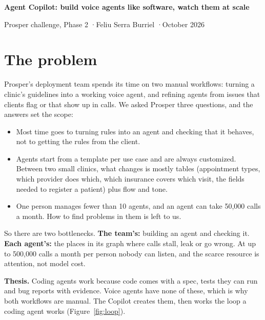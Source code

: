 \documentclass[11pt,a4paper]{article}
\begin{document}
{\raggedright\LARGE\bfseries Agent Copilot: build voice agents like software, watch them at scale\par}
\vspace{2pt}
{\small Prosper challenge, Phase 2 \quad·\quad Feliu Serra Burriel \quad·\quad October 2026}

\section{The problem}

Prosper's deployment team spends its time on two manual workflows: turning a clinic's guidelines into a working voice agent, and refining agents from issues that clients flag or that show up in calls. We asked Prosper three questions, and the answers set the scope:
\begin{itemize}
  \item Most time goes to turning rules into an agent and checking that it behaves, not to getting the rules from the client.
  \item Agents start from a template per use case and are always customized. Between two small clinics, what changes is mostly tables (appointment types, which provider does which, which insurance covers which visit, the fields needed to register a patient) plus flow and tone.
  \item One person manages fewer than 10 agents, and an agent can take 50,000 calls a month. How to find problems in them is left to us.
\end{itemize}

So there are two bottlenecks. \textbf{The team's:} building an agent and checking it. \textbf{Each agent's:} the places in its graph where calls stall, leak or go wrong. At up to 500,000 calls a month per person nobody can listen, and the scarce resource is attention, not model cost.

\textbf{Thesis.} Coding agents work because code comes with a spec, tests they can run and bug reports with evidence. Voice agents have none of these, which is why both workflows are manual. The Copilot creates them, then works the loop a coding agent works (Figure~\ref{fig:loop}).
\end{document}
